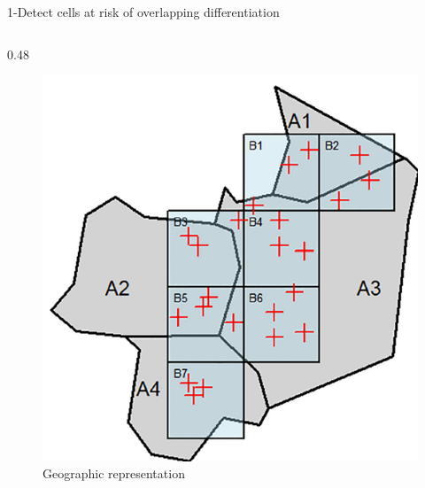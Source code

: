 \documentclass[final,xcolor={dvipsnames,svgnames,table}]{beamer}
\newlength{\colwidth}
\begin{document}
\begin{frame}[fragile,t]
\begin{columns}[t]
\begin{column}{\colwidth}
\begin{block}{1-Detect cells at risk of overlapping differentiation}
\begin{columns}
    \begin{column}{0.48\colwidth}
        \begin{figure}
            \centering
            \caption{Geographic representation}
            \includegraphics[scale=0.75]{Images/example_canonique.png}
        \end{figure}
    \end{column}
    
    \hfill
    

\end{columns}
\end{block}
\end{column}
\end{columns}
\end{frame}
\end{document}
